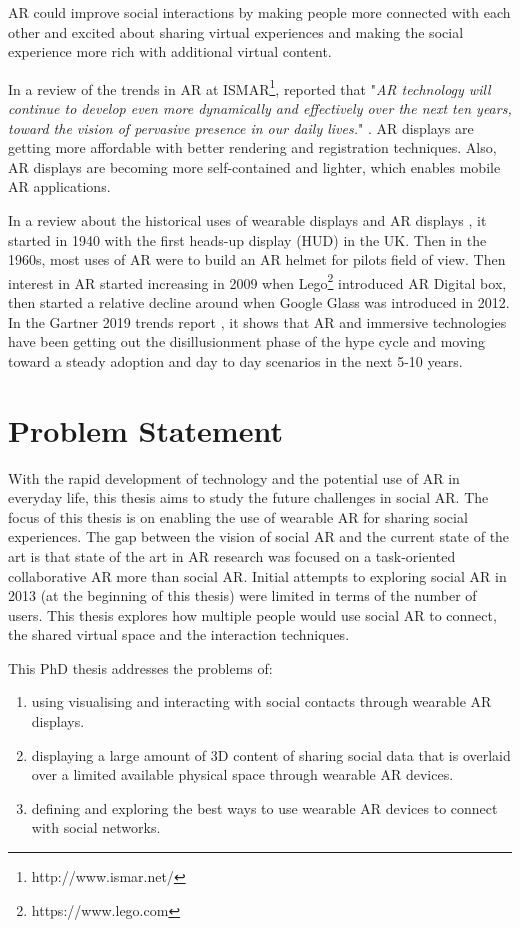 AR could improve social interactions by making people more connected with each other and excited about sharing virtual experiences and making the social experience more rich with additional virtual content. 

In a review of the trends in AR at ISMAR\footnote{http://www.ismar.net/}, \textcite{Zhou2008, Kim2018} reported that "\textit{AR technology will continue to develop even more dynamically and effectively over the next ten years, toward the vision of pervasive presence in our daily lives.}" \cite{Kim2018}. AR displays are getting more affordable with better rendering and registration techniques. Also, AR displays are becoming more self-contained and lighter, which enables mobile AR applications.

In a review about the historical uses of wearable displays and AR displays \cite{Peddie2017}, it started in 1940 with the first heads-up display (HUD) in the UK. Then in the 1960s, most uses of AR were to build an AR helmet for pilots field of view. Then interest in AR started increasing in 2009 when Lego\footnote{https://www.lego.com} introduced AR Digital box, then started a relative decline around when Google Glass was introduced in 2012. In the Gartner 2019 trends report \cite{gartner2019}, it shows that AR and immersive technologies have been getting out the disillusionment phase of the hype cycle and moving toward a steady adoption and day to day scenarios in the next 5-10 years.

\section{Problem Statement}

With the rapid development of technology and the potential use of AR in everyday life, this thesis aims to study the future challenges in social AR. The focus of this thesis is on enabling the use of wearable AR for sharing social experiences. The gap between the vision of social AR and the current state of the art is that state of the art in AR research was focused on a task-oriented collaborative AR more than social AR. Initial attempts to exploring social AR in 2013 (at the beginning of this thesis) were limited in terms of the number of users. This thesis explores how multiple people would use social AR to connect, the shared virtual space and the interaction techniques. 

This PhD thesis addresses the problems of: 
\begin{enumerate}
    \item using visualising and interacting with social contacts through wearable AR displays.
    \item displaying a large amount of 3D content of sharing social data that is overlaid over a limited available physical space through wearable AR devices.
    \item defining and exploring the best ways to use wearable AR devices to connect with social networks.
\end{enumerate}

